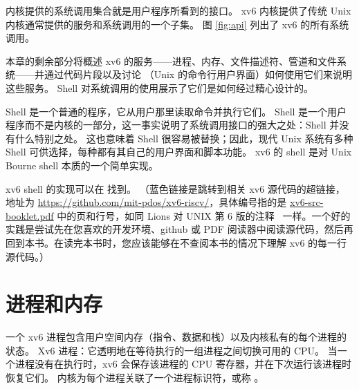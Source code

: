 内核提供的系统调用集合就是用户程序所看到的接口。
xv6 内核提供了传统 Unix 内核通常提供的服务和系统调用的一个子集。
图 \ref{fig:api} 列出了 xv6 的所有系统调用。

本章的剩余部分将概述 xv6 的服务——进程、内存、文件描述符、管道和文件系统——并通过代码片段以及讨论 （Unix 的命令行用户界面）如何使用它们来说明这些服务。 Shell 对系统调用的使用展示了它们是如何经过精心设计的。

Shell 是一个普通的程序，它从用户那里读取命令并执行它们。
Shell 是一个用户程序而不是内核的一部分，这一事实说明了系统调用接口的强大之处：Shell 并没有什么特别之处。
这也意味着 Shell 很容易被替换；因此，现代 Unix 系统有多种 Shell 可供选择，每种都有其自己的用户界面和脚本功能。
xv6 的 shell 是对 Unix Bourne shell 本质的一个简单实现。

xv6 shell 的实现可以在  找到。 （蓝色链接是跳转到相关 xv6 源代码的超链接，地址为 \url{https://github.com/mit-pdos/xv6-riscv/}，具体编号指的是 \href{xv6-src-booklet.pdf}{xv6-src-booklet.pdf} 中的页和行号，如同 Lions 对 UNIX 第 6 版的注释~\cite{lions} 一样。一个好的实践是尝试先在您喜欢的开发环境、github 或 PDF 阅读器中阅读源代码，然后再回到本书。在读完本书时，您应该能够在不查阅本书的情况下理解 xv6 的每一行源代码。）

\section{进程和内存}

一个 xv6 进程包含用户空间内存（指令、数据和栈）以及内核私有的每个进程的状态。
Xv6 
进程：它透明地在等待执行的一组进程之间切换可用的 CPU。
当一个进程没有在执行时，xv6 会保存该进程的 CPU 寄存器，并在下次运行该进程时恢复它们。
内核为每个进程关联了一个进程标识符，或称
。

